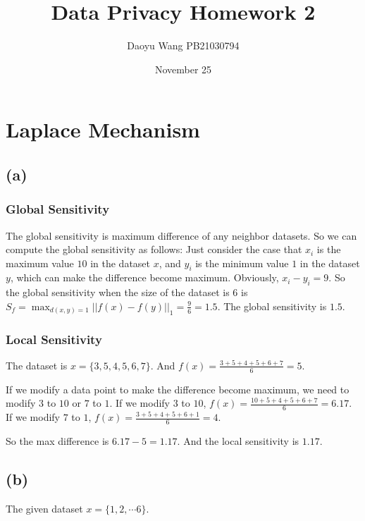 \documentclass[a4paper,12pt]{article}
\title{Data Privacy Homework 2}
\author{Daoyu Wang  PB21030794}
\date{November 25}
\begin{document}
\maketitle
{}
\tableofcontents
\newpage
\section{Laplace Mechanism}
\subsection{(a)}
\subsubsection{Global Sensitivity}
The global sensitivity is maximum difference of any neighbor datasets. So we can compute the global sensitivity as follows:
Just consider the case that $x_i$ is the maximum value $10$ in the dataset $x$, and $y_i$ is the minimum value $1$ in the dataset $y$, which can make the difference become maximum.
Obviously, $x_i - y_i = 9$. So the global sensitivity when the size of the dataset is $6$ is $S_f = \max_{d(x,y) = 1}||f(x) - f(y)||_1 = \frac{9}{6} = 1.5$. The global sensitivity is $1.5$.
\subsubsection{Local Sensitivity}
The dataset is $x = \{3, 5, 4, 5, 6, 7\}$. And $f(x) = \frac{3 + 5 + 4 + 5 + 6 + 7}{6} = 5$.



If we modify a data point to make the difference become maximum, we need to modify $3$ to $10$ or $7$ to $1$.
If we modify $3$ to $10$, $f(x) = \frac{10 + 5 + 4 + 5 + 6 + 7}{6} = 6.17$.
If we modify $7$ to $1$, $f(x) = \frac{3 + 5 + 4 + 5 + 6 + 1}{6} = 4$.

So the max difference is $6.17 - 5 = 1.17$. And the local sensitivity is $1.17$.
\subsection{(b)}
The given dataset $x = \{1, 2, \cdots 6\}$.
\end{document}
